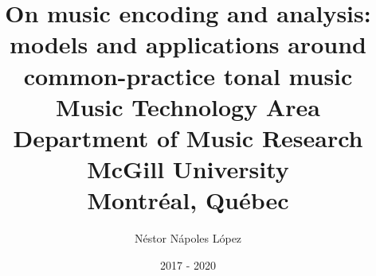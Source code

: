 \documentclass[11pt]{report}
\title{%
On music encoding and analysis: models and applications around common-practice tonal music \\
Music Technology Area \\
Department of Music Research \\
McGill University \\
Montr\'eal, Qu\'ebec}
\author{N\'estor N\'apoles L\'opez}
\date{2017 - 2020}
\begin{document}
\maketitle
\tableofcontents{}










\end{document}

